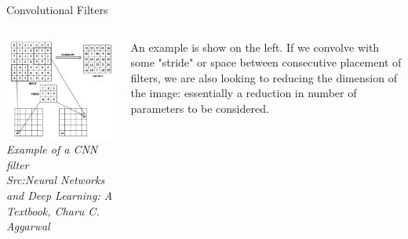 \begin{frame}{Convolutional Filters}
	\begin{columns}[T]
        \begin{column}{0.5\textwidth}
        	\includegraphics[width=\textwidth]{images/CNN_filter_ex.png}
			\tiny{\textit{Example of a CNN filter\\Src:Neural Networks and Deep Learning: A Textbook, Charu C. Aggarwal }}
        \end{column}
		\begin{column}{0.5\textwidth}
	    An example is show on the left. If we convolve with some "stride" or space between consecutive placement of filters, we are also looking to reducing the dimension of the image: essentially a reduction in number of parameters to be considered.
		\end{column} 
    \end{columns}
\end{frame}

